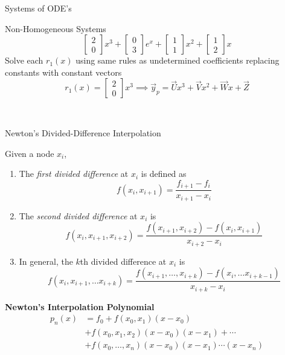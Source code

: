 \documentclass{article}
\begin{document}
\begin{multicols*}{3}
\begin{blackbox}{Systems of ODE's}
{\begin{bluebox}{Non-Homogeneous Systems}
{\[\begin{bmatrix}
                2\\
                0
            \end{bmatrix}x^3 + \begin{bmatrix}
                0\\
                3
            \end{bmatrix}e^x + \begin{bmatrix}
                1\\
                1
            \end{bmatrix}x^2 + \begin{bmatrix}
                1\\
                2
            \end{bmatrix}x\]
            }
            Solve each $r_1(x)$ using same rules as undetermined coefficients replacing constants with constant vectors
            \[r_1(x) = \begin{bmatrix}
                2\\0
            \end{bmatrix}x^3 \implies \vec{y}_p = \vec{U}x^3 + \vec{V}x^2 + \vec{W}x + \vec{Z} \]
        \end{bluebox}\\[-2ex]
        }
    \end{blackbox}
    \begin{blackbox}{Newton's Divided-Difference Interpolation}
        {\footnotesize
        Given a node $x_i$, 
        \begin{enumerate}[leftmargin=5pt]
            \item The \emph{first divided difference} at $x_i$ is defined as 
            \[f(x_i,x_{i+1}) = \frac{f_{i+1}- f_i}{x_{i+1} - x_i}\]
            \item The \emph{second divided difference} at $x_i$ is 
            \[f(x_i, x_{i+1}, x_{i+2}) = \frac{f(x_{i+1}, x_{i+2}) - f(x_i,x_{i+1})}{x_{i+2}-x_i}\]
            \item In general, the $k$th divided difference at $x_i$ is 
            \[f(x_i, x_{i+1}, \ldots x_{i+k}) = \frac{f(x_{i+1},\ldots, x_{i+k}) - f(x_i, \ldots x_{i+k-1})}{x_{i+k}-x_i}\]
        \end{enumerate}
        \textbf{Newton's Interpolation Polynomial} 
        \begin{align*}
            p_n(x) &= f_0 + f(x_0,x_1)(x-x_0)\\
            &+ f(x_0,x_1,x_2)(x-x_0)(x-x_1) + \cdots\\
            &+ f(x_0,\ldots,x_n)(x-x_0)(x-x_1)\cdots(x - x_n)

\end{align*}}
\end{blackbox}
\end{multicols*}
\end{document}
